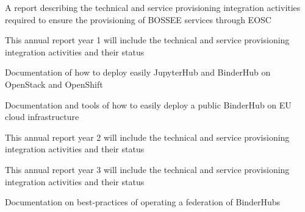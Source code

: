 \begin{workpackage}
\begin{wpdescription}
\end{wpdescription}

\begin{tasklist}
% 



\end{tasklist}

\begin{wpdelivs}
    \begin{wpdeliv}[due=6,miles=community,id=eosc-annual-report,dissem=PU,nature=R,lead=EGI]
    {A report describing the technical and service provisioning integration activities required to ensure the provisioning of BOSSEE services through EOSC}
  \end{wpdeliv}
    \begin{wpdeliv}[due=12,miles=community,id=eosc-annual-report-1,dissem=PU,nature=R,lead=EGI]
    {This annual report year 1 will include the technical and service provisioning integration activities and their status}
  \end{wpdeliv}
  \begin{wpdeliv}[due=18,miles=startup,id=openstack-openshift-documentation,dissem=PU,nature=R,lead=EP]
    {Documentation of how to deploy easily JupyterHub and BinderHub on OpenStack and OpenShift}
  \end{wpdeliv}
  \begin{wpdeliv}[due=24,miles=prototype,id=eu-binder-instance,dissem=PU,nature=R,lead=SRL]
    {Documentation and tools of how to easily deploy a public BinderHub on EU
    cloud infrastructure}
  \end{wpdeliv}
  \begin{wpdeliv}[due=24,miles=community,id=eosc-annual-report-2,dissem=PU,nature=R,lead=EGI]
    {This annual report year 2 will include the technical and service provisioning integration activities and their status}
  \end{wpdeliv}
  \begin{wpdeliv}[due=36,miles=community,id=eosc-annual-report-3,dissem=PU,nature=R,lead=EGI]
    {This annual report year 3 will include the technical and service provisioning integration activities and their status}
  \end{wpdeliv}
  \begin{wpdeliv}[due=48,miles=final,id=binder-federation,dissem=PU,nature=R,lead=SRL]
    {Documentation on best-practices of operating a federation of BinderHubs}
  \end{wpdeliv}
\end{wpdelivs}
\end{workpackage}

